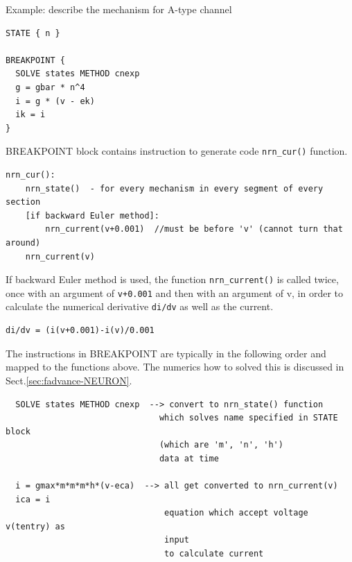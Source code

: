 Example: describe the mechanism for A-type channel
\begin{verbatim}
STATE { n }

BREAKPOINT {
  SOLVE states METHOD cnexp
  g = gbar * n^4
  i = g * (v - ek)
  ik = i
}
\end{verbatim}

BREAKPOINT block contains instruction to generate code \verb!nrn_cur()!
function.
\begin{verbatim}
nrn_cur():
    nrn_state()  - for every mechanism in every segment of every section
    [if backward Euler method]:
        nrn_current(v+0.001)  //must be before 'v' (cannot turn that around)
    nrn_current(v)
\end{verbatim} 
If backward Euler method is used, the function \verb!nrn_current()! is called
twice, once with an argument of \verb!v+0.001! and then with an argument of v,
in order to calculate the numerical derivative \verb!di/dv! as well as the
current.
\begin{verbatim}
di/dv = (i(v+0.001)-i(v)/0.001
\end{verbatim}       

The instructions in BREAKPOINT are typically in the following order and mapped
to the functions above. The numerics how to solved this is discussed in
Sect.\ref{sec:fadvance-NEURON}.

\label{sec:nrn_state()-NEURON}
\label{sec:nrn_current()-NEURON}

{\small 
  \begin{verbatim}
  SOLVE states METHOD cnexp  --> convert to nrn_state() function 
                               which solves name specified in STATE block
                               (which are 'm', 'n', 'h')
                               data at time
                                
  i = gmax*m*m*m*h*(v-eca)  --> all get converted to nrn_current(v)
  ica = i                     
                                equation which accept voltage v(tentry) as
                                input 
                                to calculate current
                                
  \end{verbatim}
}


       

